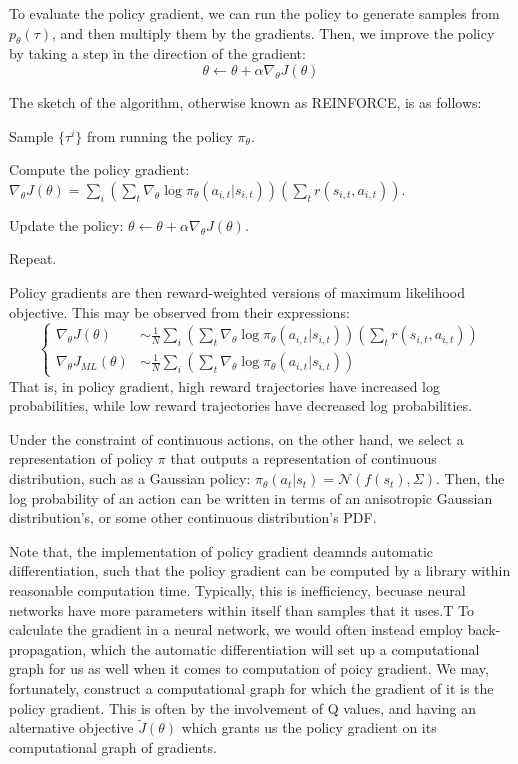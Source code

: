 To evaluate the policy gradient, we can run the policy to generate samples from $p_\theta (\tau)$, and then multiply them by the gradients.
Then, we improve the policy by taking a step in the direction of the gradient:
\[
    \theta \leftarrow \theta + \alpha \nabla_\theta J(\theta)
\]

The sketch of the algorithm, otherwise known as REINFORCE, is as follows:
\begin{bindenum}
    \item Sample $\{\tau^i\}$ from running the policy $\pi_\theta$.
    \item Compute the policy gradient: $\nabla_\theta J(\theta) = \sum_i (\sum_t \nabla_\theta \log \pi_\theta(a_{i,t} | s_{i,t})) (\sum_t r(s_{i,t}, a_{i,t}))$.
    \item Update the policy: $\theta \leftarrow \theta + \alpha \nabla_\theta J(\theta)$.
    \item Repeat.
\end{bindenum}

Policy gradients are then reward-weighted versions of maximum likelihood objective.
This may be observed from their expressions:
\[
    \begin{cases}
        \nabla_\theta J(\theta) &\sim \frac{1}{N} \sum_i (\sum_t \nabla_\theta \log \pi_\theta(a_{i,t} | s_{i,t})) (\sum_t r(s_{i,t}, a_{i,t})) \\
        \nabla_\theta J_{ML} (\theta) &\sim \frac{1}{N} \sum_i (\sum_t \nabla_\theta \log \pi_\theta(a_{i,t} | s_{i,t}))
    \end{cases}
\]
That is, in policy gradient, high reward trajectories have increased log probabilities, while low reward trajectories have decreased log probabilities.

Under the constraint of continuous actions, on the other hand, we select a representation of policy $\pi$ that outputs a representation of continuous distribution, such as a Gaussian policy: $\pi_\theta (a_t | s_t) = \mathcal{N}(f(s_t), \Sigma)$.
Then, the log probability of an action can be written in terms of an anisotropic Gaussian distribution's, or some other continuous distribution's PDF.

Note that, the implementation of policy gradient deamnds automatic differentiation, such that the policy gradient can be computed by a library within reasonable computation time.
Typically, this is inefficiency, becuase neural networks have more parameters within itself than samples that it uses.T
To calculate the gradient in a neural network, we would often instead employ back-propagation, which the automatic differentiation will set up a computational graph for us as well when it comes to computation of poicy gradient.
We may, fortunately, construct a computational graph for which the gradient of it is the policy gradient.
This is often by the involvement of Q values, and having an alternative objective $\tilde{J}(\theta)$ which grants us the policy gradient on its computational graph of gradients.


